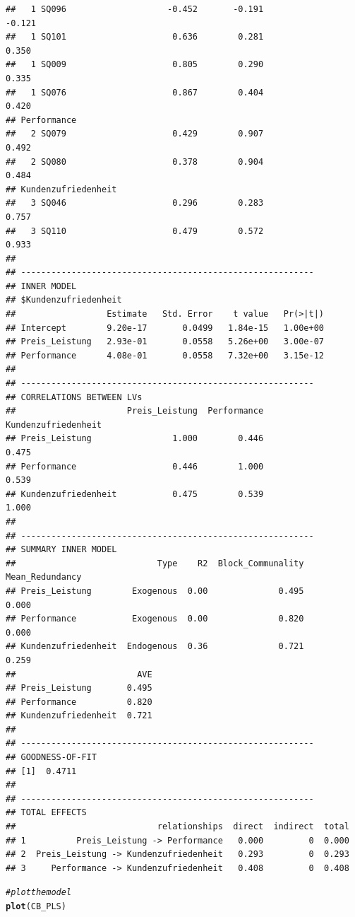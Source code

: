 \documentclass{article}\usepackage[]{graphicx}\usepackage[]{color}
\makeatletter
\newcommand{\hlcom}[1]{\textcolor[rgb]{0.678,0.584,0.686}{\textit{#1}}}%
\newcommand{\hlstd}[1]{\textcolor[rgb]{0.345,0.345,0.345}{#1}}%
\newcommand{\hlkwd}[1]{\textcolor[rgb]{0.737,0.353,0.396}{\textbf{#1}}}%
\newenvironment{kframe}{%
 \def\at@end@of@kframe{}%
 \ifinner\ifhmode%
  \def\at@end@of@kframe{\end{minipage}}%
  \begin{minipage}{\columnwidth}%
 \fi\fi%
 \def\FrameCommand##1{\hskip\@totalleftmargin \hskip-\fboxsep
 \colorbox{shadecolor}{##1}\hskip-\fboxsep
     \hskip-\linewidth \hskip-\@totalleftmargin \hskip\columnwidth}%
 \MakeFramed {\advance\hsize-\width
   \@totalleftmargin\z@ \linewidth\hsize
   \@setminipage}}%
 {\par\unskip\endMakeFramed%
 \at@end@of@kframe}
\newenvironment{knitrout}{}{} %
\makeatother
\begin{document}
\begin{knitrout}
\begin{kframe}
\begin{verbatim}
##   1 SQ096                    -0.452       -0.191               -0.121
##   1 SQ101                     0.636        0.281                0.350
##   1 SQ009                     0.805        0.290                0.335
##   1 SQ076                     0.867        0.404                0.420
## Performance                                                          
##   2 SQ079                     0.429        0.907                0.492
##   2 SQ080                     0.378        0.904                0.484
## Kundenzufriedenheit                                                  
##   3 SQ046                     0.296        0.283                0.757
##   3 SQ110                     0.479        0.572                0.933
## 
## ---------------------------------------------------------- 
## INNER MODEL 
## $Kundenzufriedenheit
##                  Estimate   Std. Error    t value   Pr(>|t|)
## Intercept        9.20e-17       0.0499   1.84e-15   1.00e+00
## Preis_Leistung   2.93e-01       0.0558   5.26e+00   3.00e-07
## Performance      4.08e-01       0.0558   7.32e+00   3.15e-12
## 
## ---------------------------------------------------------- 
## CORRELATIONS BETWEEN LVs 
##                      Preis_Leistung  Performance  Kundenzufriedenheit
## Preis_Leistung                1.000        0.446                0.475
## Performance                   0.446        1.000                0.539
## Kundenzufriedenheit           0.475        0.539                1.000
## 
## ---------------------------------------------------------- 
## SUMMARY INNER MODEL 
##                            Type    R2  Block_Communality  Mean_Redundancy
## Preis_Leistung        Exogenous  0.00              0.495            0.000
## Performance           Exogenous  0.00              0.820            0.000
## Kundenzufriedenheit  Endogenous  0.36              0.721            0.259
##                        AVE
## Preis_Leistung       0.495
## Performance          0.820
## Kundenzufriedenheit  0.721
## 
## ---------------------------------------------------------- 
## GOODNESS-OF-FIT 
## [1]  0.4711
## 
## ---------------------------------------------------------- 
## TOTAL EFFECTS 
##                            relationships  direct  indirect  total
## 1          Preis_Leistung -> Performance   0.000         0  0.000
## 2  Preis_Leistung -> Kundenzufriedenheit   0.293         0  0.293
## 3     Performance -> Kundenzufriedenheit   0.408         0  0.408
\end{verbatim}
\begin{alltt}
\hlcom{#plot the model}
\hlkwd{plot}\hlstd{(CB_PLS)}

\end{alltt}
\end{kframe}
\end{knitrout}
\end{document}
